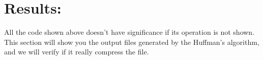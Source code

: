 \section{Results:}

All the code shown above doesn't have significance if its operation is not shown. This section will show you the output files generated by the Huffman's algorithm, and we will verify if it really compress the file. \hfill \break
